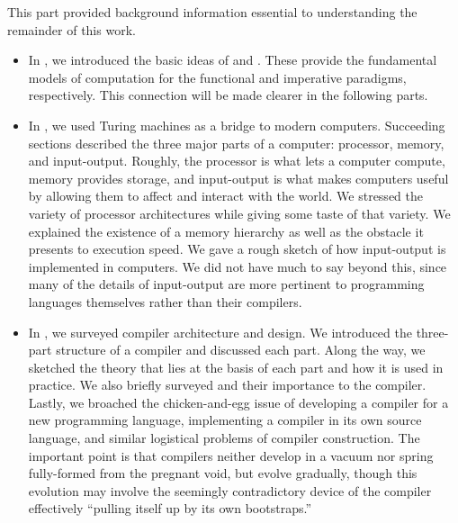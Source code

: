 \label{imperative:conclusion}
This part provided background information essential to understanding the remainder of this work.
\begin{itemize}
\item In , we introduced the basic ideas of \lambdacalc and \TMs. These provide the fundamental models of computation for the functional and imperative paradigms, respectively. This connection will be made clearer in the following parts.

\item In , we used Turing machines as a bridge to modern computers. Succeeding sections described the three major parts of a computer: processor, memory, and input-output. Roughly, the processor is what lets a computer compute, memory provides storage, and input-output is what makes computers useful by allowing them to affect and interact with the world. We stressed the variety of processor architectures while giving some taste of that variety. We explained the existence of a memory hierarchy as well as the obstacle it presents to execution speed. We gave a rough sketch of how input-output is implemented in computers. We did not have much to say beyond this, since many of the details of input-output are more pertinent to programming languages themselves rather than their compilers.

\item In , we surveyed compiler architecture and design. We introduced the three-part structure of a compiler and discussed each part. Along the way, we sketched the theory that lies at the basis of each part and how it is used in practice. We also briefly surveyed \IRs and their importance to the compiler. Lastly, we broached the chicken-and-egg issue of developing a compiler for a new programming language, implementing a compiler in its own source language, and similar logistical problems of compiler construction. The important point is that compilers neither develop in a vacuum nor spring fully-formed from the pregnant void, but evolve gradually, though this evolution may involve the seemingly contradictory device of the compiler effectively ``pulling itself up by its own bootstraps.''
\end{itemize}

